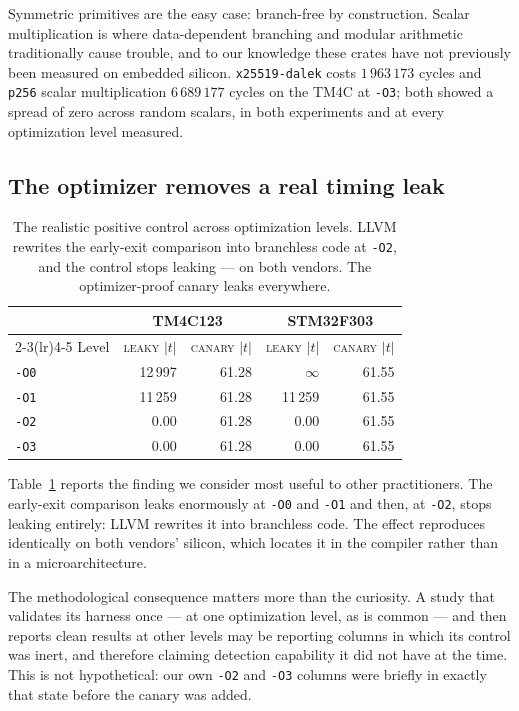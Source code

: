 \documentclass[11pt,a4paper]{article}
\begin{document}
Symmetric primitives are the easy case: branch-free by construction. Scalar
multiplication is where data-dependent branching and modular arithmetic
traditionally cause trouble, and to our knowledge these crates have not
previously been measured on embedded silicon. \texttt{x25519-dalek} costs
$1\,963\,173$ cycles and \texttt{p256} scalar multiplication $6\,689\,177$
cycles on the TM4C at \texttt{-O3}; both showed a spread of zero across random
scalars, in both experiments and at every optimization level measured.

\subsection{The optimizer removes a real timing leak}
\label{sec:optimizer}

\begin{table}[t]
\centering
\caption{The realistic positive control across optimization levels. LLVM
rewrites the early-exit comparison into branchless code at \texttt{-O2}, and the
control stops leaking --- on both vendors. The optimizer-proof canary leaks
everywhere.}
\label{tab:optimizer}
\begin{tabular}{lrrrr}
\toprule
 & \multicolumn{2}{c}{TM4C123} & \multicolumn{2}{c}{STM32F303} \\
\cmidrule(lr){2-3}\cmidrule(lr){4-5}
Level & \textsc{leaky} $|t|$ & \textsc{canary} $|t|$ & \textsc{leaky} $|t|$ & \textsc{canary} $|t|$ \\
\midrule
\texttt{-O0} & 12\,997 & 61.28 & $\infty$ & 61.55 \\
\texttt{-O1} & 11\,259 & 61.28 & 11\,259 & 61.55 \\
\texttt{-O2} & 0.00 & 61.28 & 0.00 & 61.55 \\
\texttt{-O3} & 0.00 & 61.28 & 0.00 & 61.55 \\
\bottomrule
\end{tabular}
\end{table}

Table~\ref{tab:optimizer} reports the finding we consider most useful to other
practitioners. The early-exit comparison leaks enormously at \texttt{-O0} and
\texttt{-O1} and then, at \texttt{-O2}, stops leaking entirely: LLVM rewrites it
into branchless code. The effect reproduces identically on both vendors'
silicon, which locates it in the compiler rather than in a microarchitecture.

The methodological consequence matters more than the curiosity. A study that
validates its harness once --- at one optimization level, as is common --- and
then reports clean results at other levels may be reporting columns in which its
control was inert, and therefore claiming detection capability it did not have
at the time. This is not hypothetical: our own \texttt{-O2} and \texttt{-O3}
columns were briefly in exactly that state before the canary was added.
\end{document}
